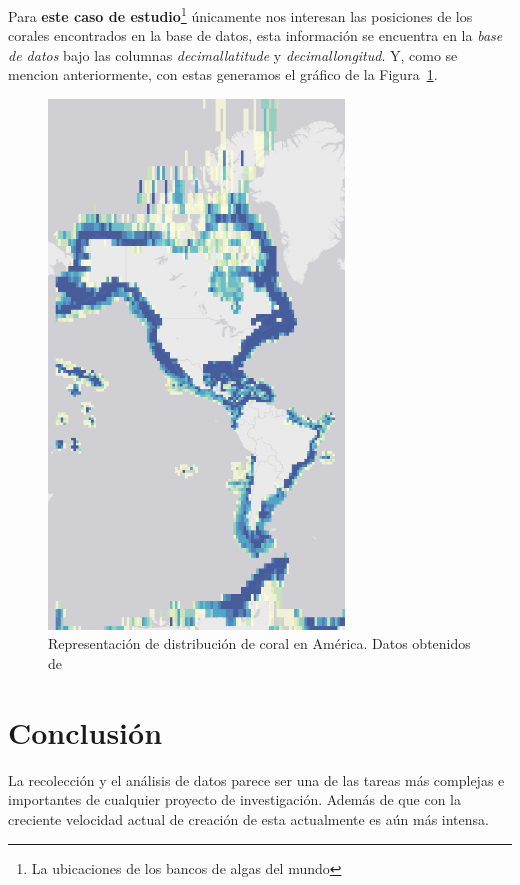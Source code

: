 \documentclass[12pt]{article}
\begin{document}
		\par Para \textbf{este caso de estudio}\footnote{La ubicaciones de los bancos de algas del mundo} \'unicamente nos interesan las posiciones de los corales encontrados en la base de datos, esta informaci\'on se encuentra en la \textit{base de datos} bajo las columnas \textit{decimallatitude} y \textit{decimallongitud}. Y, como se mencion anteriormente, con estas generamos el gr\'afico de la Figura~\ref{fig: coral en america}.

		\begin{figure}[p]
			\centering
				\includegraphics[width=0.7\textwidth]{coral-mundo.png}
			\caption{Representaci\'on de distribuci\'on de coral en Am\'erica. Datos obtenidos de \cite{db}}
			\label{fig: coral en america}
		\end{figure}


\section{Conclusi\'on}

	\par La recolecci\'on y el an\'alisis de datos parece ser una de las tareas m\'as complejas e importantes de cualquier proyecto de investigaci\'on. Adem\'as de que con la creciente velocidad actual de creaci\'on de esta actualmente es a\'un m\'as intensa.
	
\end{document}
